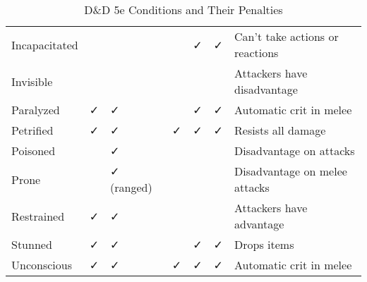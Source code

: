 \documentclass[letterpaper,landscape]{article}
\begin{document}
\begin{table}[h!]
\begin{tabular}{@{}l>{\centering}p{3cm}>{\centering}p{3cm}>{\centering}p{3cm}>{\centering}p{3cm}>{\centering}p{3cm}p{6cm}@{}}
Incapacitated      &                                              &                                              &                                             & \centering ✓                          & \centering ✓                       & Can't take actions or reactions \\ 
Invisible          &                                              &                                              &                                             &                                        &                                     & Attackers have disadvantage \\ 
Paralyzed          & \centering ✓                                & \centering ✓                                  &                                             & \centering ✓                          & \centering ✓                       & Automatic crit in melee \\ 
Petrified          & \centering ✓                                & \centering ✓                                  & \centering ✓                                & \centering ✓                          & \centering ✓                       & Resists all damage \\ 
Poisoned           &                                              & \centering ✓                                  &                                             &                                        &                                     & Disadvantage on attacks \\ 
Prone              &                                              & ✓ (ranged)                                    &                                             &                                        &                                     & Disadvantage on melee attacks \\ 
Restrained         & \centering ✓                                & \centering ✓                                  &                                             &                                        &                                     & Attackers have advantage \\ 
Stunned            & \centering ✓                                & \centering ✓                                  &                                             & \centering ✓                          & \centering ✓                       & Drops items \\ 
Unconscious        & \centering ✓                                & \centering ✓                                  & \centering ✓                                & \centering ✓                          & \centering ✓                       & Automatic crit in melee \\ \bottomrule
\end{tabular}
\caption{D\&D 5e Conditions and Their Penalties}
\label{tab:conditions}
\end{table}
\end{document}
